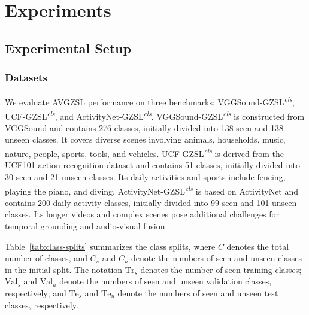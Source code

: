 
\section{Experiments}\label{sec:experiments}

\subsection{Experimental Setup}\label{sec:experimental-setup}

\subsubsection{Datasets}\label{sec:datasets}

We evaluate AVGZSL performance on three benchmarks: VGGSound-GZSL\textsuperscript{\textit{cls}}, UCF-GZSL\textsuperscript{\textit{cls}}, and ActivityNet-GZSL\textsuperscript{\textit{cls}}. VGGSound-GZSL\textsuperscript{\textit{cls}} is constructed from VGGSound \cite{chen2020vggsound} and contains 276 classes, initially divided into 138 seen and 138 unseen classes. It covers diverse scenes involving animals, households, music, nature, people, sports, tools, and vehicles. UCF-GZSL\textsuperscript{\textit{cls}} is derived from the UCF101 action-recognition dataset \cite{soomro2012ucf101} and contains 51 classes, initially divided into 30 seen and 21 unseen classes. Its daily activities and sports include fencing, playing the piano, and diving. ActivityNet-GZSL\textsuperscript{\textit{cls}} is based on ActivityNet \cite{heilbron2015activitynet} and contains 200 daily-activity classes, initially divided into 99 seen and 101 unseen classes. Its longer videos and complex scenes pose additional challenges for temporal grounding and audio-visual fusion.

Table~\ref{tab:class-splits} summarizes the class splits, where $C$ denotes the total number of classes, and ${C}_{s}$ and ${C}_{u}$ denote the numbers of seen and unseen classes in the initial split. The notation ${\mathrm{Tr}}_{s}$ denotes the number of seen training classes; ${\mathrm{Val}}_{s}$ and ${\mathrm{Val}}_{u}$ denote the numbers of seen and unseen validation classes, respectively; and ${\mathrm{Te}}_{s}$ and ${\mathrm{Te}}_{u}$ denote the numbers of seen and unseen test classes, respectively.


